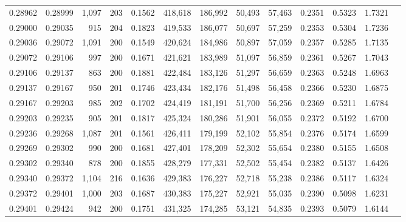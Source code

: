\begin{tabular}{rrrrrrrrrrrrr}
0.28962 & 0.28999 & 1,097 & 203 &                                     0.1562 & 418,618 & 186,992 &  50,493 &  57,463 & 0.2351 & 0.5323 & 1.7321 \\
0.29000 & 0.29035 &   915 & 204 &                                     0.1823 & 419,533 & 186,077 &  50,697 &  57,259 & 0.2353 & 0.5304 & 1.7236 \\
0.29036 & 0.29072 & 1,091 & 200 &                                     0.1549 & 420,624 & 184,986 &  50,897 &  57,059 & 0.2357 & 0.5285 & 1.7135 \\
0.29072 & 0.29106 &   997 & 200 &                                     0.1671 & 421,621 & 183,989 &  51,097 &  56,859 & 0.2361 & 0.5267 & 1.7043 \\
0.29106 & 0.29137 &   863 & 200 &                                     0.1881 & 422,484 & 183,126 &  51,297 &  56,659 & 0.2363 & 0.5248 & 1.6963 \\
0.29137 & 0.29167 &   950 & 201 &                                     0.1746 & 423,434 & 182,176 &  51,498 &  56,458 & 0.2366 & 0.5230 & 1.6875 \\
0.29167 & 0.29203 &   985 & 202 &                                     0.1702 & 424,419 & 181,191 &  51,700 &  56,256 & 0.2369 & 0.5211 & 1.6784 \\
0.29203 & 0.29235 &   905 & 201 &                                     0.1817 & 425,324 & 180,286 &  51,901 &  56,055 & 0.2372 & 0.5192 & 1.6700 \\
0.29236 & 0.29268 & 1,087 & 201 &                                     0.1561 & 426,411 & 179,199 &  52,102 &  55,854 & 0.2376 & 0.5174 & 1.6599 \\
0.29269 & 0.29302 &   990 & 200 &                                     0.1681 & 427,401 & 178,209 &  52,302 &  55,654 & 0.2380 & 0.5155 & 1.6508 \\
0.29302 & 0.29340 &   878 & 200 &                                     0.1855 & 428,279 & 177,331 &  52,502 &  55,454 & 0.2382 & 0.5137 & 1.6426 \\
0.29340 & 0.29372 & 1,104 & 216 &                                     0.1636 & 429,383 & 176,227 &  52,718 &  55,238 & 0.2386 & 0.5117 & 1.6324 \\
0.29372 & 0.29401 & 1,000 & 203 &                                     0.1687 & 430,383 & 175,227 &  52,921 &  55,035 & 0.2390 & 0.5098 & 1.6231 \\
0.29401 & 0.29424 &   942 & 200 &                                     0.1751 & 431,325 & 174,285 &  53,121 &  54,835 & 0.2393 & 0.5079 & 1.6144 \\

\end{tabular}
